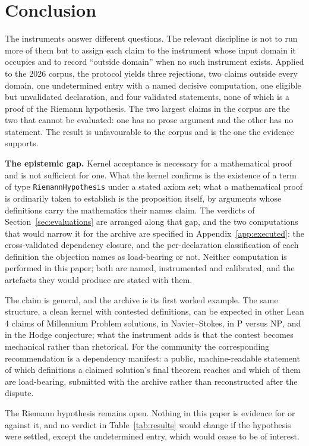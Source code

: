 \documentclass[11pt,a4paper]{article}
\newcommand{\verdict}[1]{\textsf{#1}}
\begin{document}
\section{Conclusion}

The instruments answer different questions. The relevant discipline is not to run more of
them but to assign each claim to the instrument whose input domain it occupies and to record
``outside domain'' when no such instrument exists. Applied to the 2026 corpus, the protocol yields
three rejections, two claims outside every domain, one undetermined entry with a named decisive
computation, one eligible but unvalidated declaration, and four validated statements, none of which
is a proof of the Riemann hypothesis. The two largest claims in the corpus are the two that cannot
be evaluated: one has no prose argument and the other has no statement. The result is unfavourable
to the corpus and is the one the evidence supports.

\textbf{The epistemic gap.} Kernel acceptance is necessary for a mathematical proof and is not
sufficient for one. What the kernel confirms is the existence of a term of type
\texttt{RiemannHypothesis} under a stated axiom set; what a mathematical proof is ordinarily taken
to establish is the proposition itself, by arguments whose definitions carry the mathematics their
names claim. The verdicts of Section~\ref{sec:evaluations} are arranged along that gap, and the two
computations that would narrow it for the archive are specified in
Appendix~\ref{app:executed}: the cross-validated dependency closure, and the per-declaration
classification of each definition the objection names as load-bearing or not. Neither computation
is performed in this paper; both are named, instrumented and calibrated, and the artefacts they
would produce are stated with them.

The claim is general, and the archive is its first worked example. The same structure, a clean
kernel with contested definitions, can be expected in other Lean 4 claims of Millennium Problem
solutions, in Navier--Stokes, in $\mathrm{P}$ versus $\mathrm{NP}$, and in the Hodge conjecture;
what the instrument adds is that the contest becomes mechanical rather than rhetorical. For the
community the corresponding recommendation is a dependency manifest: a public, machine-readable
statement of which definitions a claimed solution's final theorem reaches and which of them are
load-bearing, submitted with the archive rather than reconstructed after the dispute.

The Riemann hypothesis remains open. Nothing in this paper is evidence for or against it,
and no verdict in Table~\ref{tab:results} would change if the hypothesis were settled, except the
\verdict{undetermined} entry, which would cease to be of interest.
\end{document}
